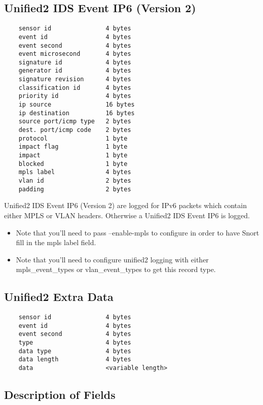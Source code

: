 \documentclass[english]{report}
\newenvironment{note}{
\samepage
    \vspace{10pt}{\textsf{
        {\hspace{7pt}\Huge{$\triangle$\hspace{-12.5pt}{\Large{$^!$}}}}\hspace{5pt}
        {\Large{NOTE}}
    }
    }
   \begin{center}
    \par\vspace{-17pt}

    \begin{lrbox}{\savepar}
    \begin{minipage}[r]{6in}
}
{
    \end{minipage}
    \end{lrbox}
    \fbox{
        \usebox{
            \savepar
	}
    }
    \par\vskip10pt
    \end{center}
}
\newenvironment{note}{
        \begin{rawhtml}
        <p><table border="1"><tr><td><b>
        Note:&nbsp;&nbsp;</b>
        \end{rawhtml}
}{
        \begin{rawhtml}
        </b></td></tr></table></p>
        \end{rawhtml}
}
\begin{document}
\subsection{Unified2 IDS Event IP6 (Version 2)}

\begin{verbatim}
    sensor id               4 bytes
    event id                4 bytes
    event second            4 bytes
    event microsecond       4 bytes
    signature id            4 bytes
    generator id            4 bytes
    signature revision      4 bytes
    classification id       4 bytes
    priority id             4 bytes
    ip source               16 bytes
    ip destination          16 bytes
    source port/icmp type   2 bytes
    dest. port/icmp code    2 bytes
    protocol                1 byte
    impact flag             1 byte
    impact                  1 byte
    blocked                 1 byte
    mpls label              4 bytes
    vlan id                 2 bytes
    padding                 2 bytes
\end{verbatim}

  Unified2 IDS Event IP6 (Version 2) are logged for IPv6 packets which
  contain either MPLS or VLAN headers. Otherwise a Unified2 IDS Event
  IP6 is logged.

\begin{note}
\begin{itemize}
\item Note that you'll need to pass --enable-mpls to configure in order to have Snort fill in the mpls label field.

\item Note that you'll need to configure unified2 logging with either mpls\_event\_types or vlan\_event\_types to get this record type.
\end{itemize}
\end{note}

\subsection{Unified2 Extra Data}

\begin{verbatim}
    sensor id               4 bytes
    event id                4 bytes
    event second            4 bytes
    type                    4 bytes
    data type               4 bytes
    data length             4 bytes
    data                    <variable length>
\end{verbatim}

\subsection{Description of Fields}
\end{document}
